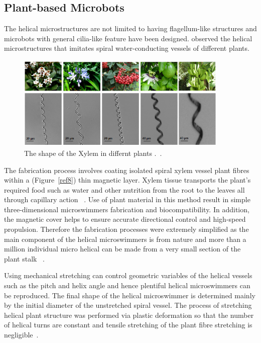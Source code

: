 \documentclass[a4paper,11pt]{article}
\begin{document}
\begin{sloppypar}
\subsection{Plant-based Microbots}

The helical microstructures are not limited to having flagellum-like structures and microbots with
general cilia-like feature have been designed. \citeauthor{gao2013bioinspired}
 observed the helical microstructures that imitates spiral water-conducting vessels of different plants. 

\begin{figure}
  \centering
    \includegraphics[width=0.9\textwidth]{plants}
  \caption{The shape of the Xylem in differnt plants .~\citep{mahoney2011velocity}.}
  \label{plants}
\end{figure}



The fabrication process involves coating isolated spiral xylem vessel plant fibres within a (Figure~\ref{ref8})
thin magnetic layer. Xylem tissue transports the plant\rq{}s required food such as water and other 
nutrition from the root to the leaves all through capillary action ~\citep{mahoney2011velocity}.
Use of plant material in this method result in simple three-dimensional microswimmers fabrication 
and biocompatibility. In addition, the magnetic cover helps to ensure accurate directional control and 
high-speed propulsion. Therefore the fabrication processes were extremely simplified as the main 
component of the helical microswimmers is from nature and more than a million individual micro helical 
can be made from a very small section of the plant stalk ~\citep{mahoney2011velocity}. 


Using mechanical stretching can control geometric variables of the helical vessels such as the pitch and
 helix angle and hence plentiful helical microswimmers can be reproduced. The final shape of the 
helical microswimmer is determined mainly by the initial diameter of the unstretched spiral vessel. The
 process of stretching helical plant structure was performed via plastic deformation so that the number 
of helical turns are constant and tensile stretching of the plant fibre stretching is negligible~\citep{mahoney2011velocity}. 


\end{sloppypar}
\end{document}
